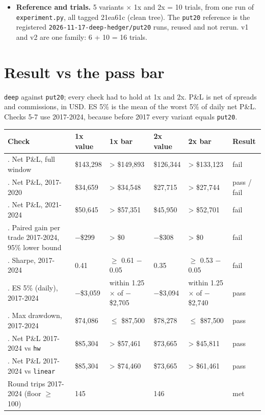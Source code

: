 \documentclass{article}
\begin{document}
\begin{itemize}
\item \textbf{Reference and trials.} 5 variants \ensuremath{\times} 1x and 2x = 10 trials, from one run of \texttt{experiment.\allowbreak{}py}, all tagged 21ea61c (clean tree). The \texttt{put20} reference is the registered \texttt{2026-\allowbreak{}11-\allowbreak{}17-\allowbreak{}deep-\allowbreak{}hedger/\allowbreak{}put20} runs, reused and not rerun. v1 and v2 are one family: 6 + 10 = 16 trials.

\end{itemize}

\section{Result vs the pass bar}

\texttt{deep} against \texttt{put20}; every check had to hold at 1x and 2x. P\&L is net of spreads and commissions, in USD. ES 5\% is the mean of the worst 5\% of daily net P\&L. Checks 5-7 use 2017-2024, because before 2017 every variant equals \texttt{put20}.

\begin{center}\small
\begin{tabularx}{\linewidth}{>{\raggedright\arraybackslash}X l >{\raggedright\arraybackslash}X l >{\raggedright\arraybackslash}X l}
\toprule
\textbf{Check} & \textbf{1x value} & \textbf{1x bar} & \textbf{2x value} & \textbf{2x bar} & \textbf{Result} \\
\midrule
1. Net P\&L, full window & \$143,298 & > \$149,893 & \$126,344 & > \$133,123 & fail \\
2. Net P\&L, 2017-2020 & \$34,659 & > \$34,548 & \$27,715 & > \$27,744 & pass / fail \\
3. Net P\&L, 2021-2024 & \$50,645 & > \$57,351 & \$45,950 & > \$52,701 & fail \\
4. Paired gain per trade 2017-2024, 95\% lower bound & $-$\$299 & > \$0 & $-$\$308 & > \$0 & fail \\
5. Sharpe, 2017-2024 & 0.41 & \ensuremath{\geq} 0.61 $-$ 0.05 & 0.35 & \ensuremath{\geq} 0.53 $-$ 0.05 & fail \\
6. ES 5\% (daily), 2017-2024 & $-$\$3,059 & within 1.25\ensuremath{\times} of $-$\$2,705 & $-$\$3,094 & within 1.25\ensuremath{\times} of $-$\$2,740 & pass \\
7. Max drawdown, 2017-2024 & \$74,086 & \ensuremath{\leq} \$87,500 & \$78,278 & \ensuremath{\leq} \$87,500 & pass \\
8. Net P\&L 2017-2024 vs \texttt{hw} & \$85,304 & > \$57,461 & \$73,665 & > \$45,811 & pass \\
9. Net P\&L 2017-2024 vs \texttt{linear} & \$85,304 & > \$74,460 & \$73,665 & > \$61,461 & pass \\
Round trips 2017-2024 (floor \ensuremath{\geq} 100) & 145 &  & 146 &  & met \\
\bottomrule
\end{tabularx}
\end{center}
\end{document}
